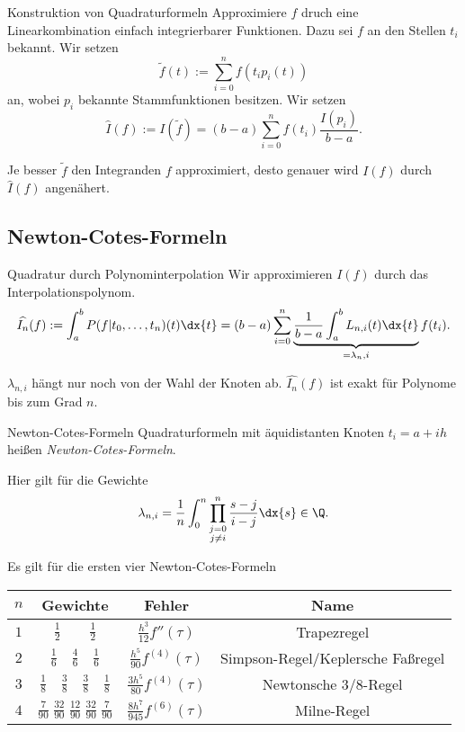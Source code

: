 \begin{karte}{Konstruktion von Quadraturformeln}
    Approximiere \(f\) druch eine Linearkombination einfach integrierbarer Funktionen. 
    Dazu sei \(f\) an den Stellen \( t_i \) bekannt. Wir setzen 
    \[ \tilde{f}(t) := \sum_{i=0}^n f(t_i p_i(t)) \]
    an, wobei \( p_i \) bekannte Stammfunktionen besitzen. Wir setzen 
    \[ \widehat{I}(f) := I(\tilde{f}) = (b-a)\sum_{i=0}^n f(t_i) \frac{I(p_i)}{b-a}. \]
    
    Je besser \(\tilde{f}\) den Integranden \(f\) approximiert, desto genauer wird \( I(f) \) 
    durch \( \widehat{I}(f) \) angenähert.
\end{karte}

\subsection*{Newton-Cotes-Formeln}

\begin{karte}{Quadratur durch Polynominterpolation}
    Wir approximieren \(I(f)\) durch das Interpolationspolynom. 
    \[ \widehat{I_n}(f) := \int_a^b P(f|t_0,\ldots, t_n)(t) \dx{t} 
    = (b-a) \sum_{i=0}^n \underbrace{\frac{1}{b-a} \int_a^b L_{n,i}(t) \dx{t} }_{=\lambda_n,i} f(t_i). \]

    \( \lambda_{n,i} \) hängt nur noch von der Wahl der Knoten ab. 
    \( \widehat{I_n}(f) \) ist exakt für Polynome bis zum Grad \(n\).
\end{karte}

\begin{karte}{Newton-Cotes-Formeln}
    Quadraturformeln mit äquidistanten Knoten \( t_i = a + ih \)
    heißen \textit{Newton-Cotes-Formeln}.

    Hier gilt für die Gewichte 
    \[ \lambda_{n,i} = \frac{1}{n} \int_0^n \prod_{\substack{j=0\\j\neq i}}^n \frac{s-j}{i-j} \dx{s} \in \Q. \]

    Es gilt für die ersten vier Newton-Cotes-Formeln 
    \begin{center}
    \begin{tabular}{c|c|c|c}
        \(n\) & Gewichte & Fehler & Name \\[10pt]\hline
        \( 1 \) & \( \frac{1}{2} \qquad \frac{1}{2} \) & \( \frac{h^3}{12} f''(\tau) \) & Trapezregel\\[10pt]
        \(2\) & \( \frac{1}{6} \quad \frac{4}{6} \quad \frac{1}{6} \) & \( \frac{h^5}{90} f^{(4)}(\tau) \) & Simpson-Regel/Keplersche Faßregel \\[10pt]
        \(3\) & \( \frac{1}{8} \quad \frac{3}{8} \quad \frac{3}{8} \quad \frac{1}{8} \) & \( \frac{3h^5}{80} f^{(4)}(\tau) \) & Newtonsche 3/8-Regel \\[10pt]
        \( 4 \) & \( \frac{7}{90} \; \frac{32}{90} \; \frac{12}{90} \; \frac{32}{90} \; \frac{7}{90} \) & \( \frac{8h^7}{945} f^{(6)}(\tau) \) & Milne-Regel
    \end{tabular}
    \end{center}
    
\end{karte}

